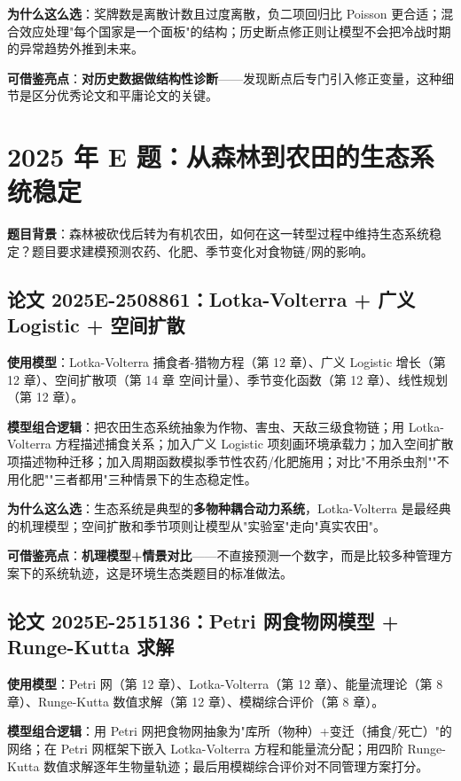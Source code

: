 \textbf{为什么这么选}：奖牌数是离散计数且过度离散，负二项回归比 Poisson 更合适；混合效应处理"每个国家是一个面板"的结构；历史断点修正则让模型不会把冷战时期的异常趋势外推到未来。

\textbf{可借鉴亮点}：\textbf{对历史数据做结构性诊断}——发现断点后专门引入修正变量，这种细节是区分优秀论文和平庸论文的关键。

\section{2025 年 E 题：从森林到农田的生态系统稳定}

\textbf{题目背景}：森林被砍伐后转为有机农田，如何在这一转型过程中维持生态系统稳定？题目要求建模预测农药、化肥、季节变化对食物链/网的影响。

\subsection{论文 2025E-2508861：Lotka-Volterra + 广义 Logistic + 空间扩散}
\textbf{使用模型}：Lotka-Volterra 捕食者-猎物方程（第 12 章）、广义 Logistic 增长（第 12 章）、空间扩散项（第 14 章 空间计量）、季节变化函数（第 12 章）、线性规划（第 12 章）。

\textbf{模型组合逻辑}：把农田生态系统抽象为作物、害虫、天敌三级食物链；用 Lotka-Volterra 方程描述捕食关系；加入广义 Logistic 项刻画环境承载力；加入空间扩散项描述物种迁移；加入周期函数模拟季节性农药/化肥施用；对比"不用杀虫剂""不用化肥""三者都用"三种情景下的生态稳定性。

\textbf{为什么这么选}：生态系统是典型的\textbf{多物种耦合动力系统}，Lotka-Volterra 是最经典的机理模型；空间扩散和季节项则让模型从"实验室"走向"真实农田"。

\textbf{可借鉴亮点}：\textbf{机理模型+情景对比}——不直接预测一个数字，而是比较多种管理方案下的系统轨迹，这是环境生态类题目的标准做法。

\subsection{论文 2025E-2515136：Petri 网食物网模型 + Runge-Kutta 求解}
\textbf{使用模型}：Petri 网（第 12 章）、Lotka-Volterra（第 12 章）、能量流理论（第 8 章）、Runge-Kutta 数值求解（第 12 章）、模糊综合评价（第 8 章）。

\textbf{模型组合逻辑}：用 Petri 网把食物网抽象为"库所（物种）+变迁（捕食/死亡）"的网络；在 Petri 网框架下嵌入 Lotka-Volterra 方程和能量流分配；用四阶 Runge-Kutta 数值求解逐年生物量轨迹；最后用模糊综合评价对不同管理方案打分。

